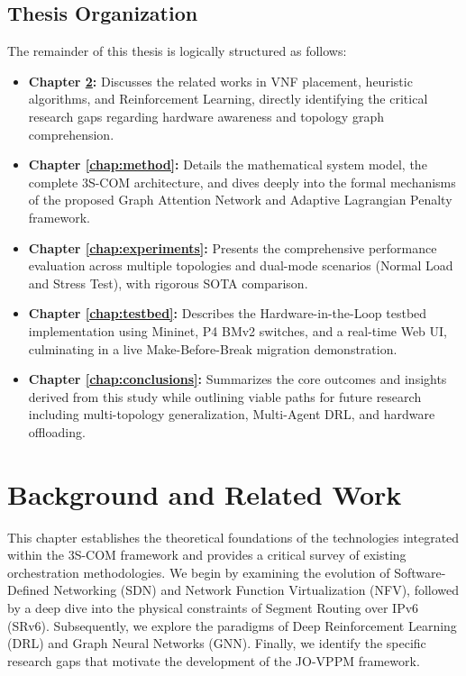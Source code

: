 \documentclass[12pt, a4paper, reqno, oneside]{book}
\begin{document}
\section{Thesis Organization}
The remainder of this thesis is logically structured as follows:
\begin{itemize}
    \item \textbf{Chapter \ref{chap:background_related}:} Discusses the related works in VNF placement, heuristic algorithms, and Reinforcement Learning, directly identifying the critical research gaps regarding hardware awareness and topology graph comprehension.
    \item \textbf{Chapter \ref{chap:method}:} Details the mathematical system model, the complete 3S-COM architecture, and dives deeply into the formal mechanisms of the proposed Graph Attention Network and Adaptive Lagrangian Penalty framework.
    \item \textbf{Chapter \ref{chap:experiments}:} Presents the comprehensive performance evaluation across multiple topologies and dual-mode scenarios (Normal Load and Stress Test), with rigorous SOTA comparison.
    \item \textbf{Chapter \ref{chap:testbed}:} Describes the Hardware-in-the-Loop testbed implementation using Mininet, P4 BMv2 switches, and a real-time Web UI, culminating in a live Make-Before-Break migration demonstration.
    \item \textbf{Chapter \ref{chap:conclusions}:} Summarizes the core outcomes and insights derived from this study while outlining viable paths for future research including multi-topology generalization, Multi-Agent DRL, and hardware offloading.
\end{itemize}

\chapter{Background and Related Work}
\label{chap:background_related}

This chapter establishes the theoretical foundations of the technologies integrated within the 3S-COM framework and provides a critical survey of existing orchestration methodologies. We begin by examining the evolution of Software-Defined Networking (SDN) and Network Function Virtualization (NFV), followed by a deep dive into the physical constraints of Segment Routing over IPv6 (SRv6). Subsequently, we explore the paradigms of Deep Reinforcement Learning (DRL) and Graph Neural Networks (GNN). Finally, we identify the specific research gaps that motivate the development of the JO-VPPM framework.
\end{document}
